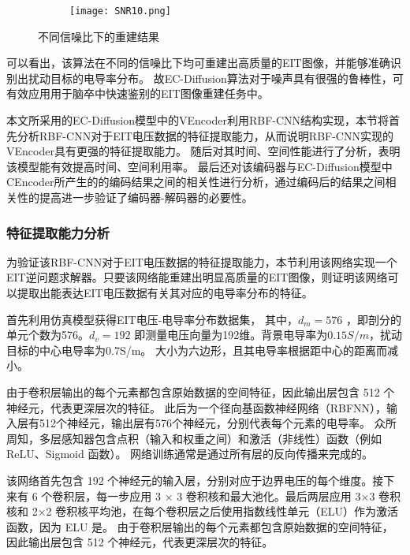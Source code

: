 \newcommand{\subfiggggg}{
\begin{subfigure}[b]{0.8\linewidth}
\centering
\texttt{[image: SNR10.png]}
\subcaption{信噪比为10时的重建结果}
\end{subfigure}
\label{subfigure:SNR30}
}

\begin{figure}[H]
    \subfigg
    \subfiggg
    \subfigggg
    \subfiggggg
    \caption{不同信噪比下的重建结果}
    \label{fig:SNR}
\end{figure}

可以看出，该算法在不同的信噪比下均可重建出高质量的EIT图像，并能够准确识别出扰动目标的电导率分布。
故EC-Diffusion算法对于噪声具有很强的鲁棒性，可有效应用用于脑卒中快速鉴别的EIT图像重建任务中。


本文所采用的EC-Diffusion模型中的VEncoder利用RBF-CNN结构实现，本节将首先分析RBF-CNN对于EIT电压数据的特征提取能力，从而说明RBF-CNN实现的VEncoder具有更强的特征提取能力。
随后对其时间、空间性能进行了分析，表明该模型能有效提高时间、空间利用率。
最后还对该编码器与EC-Diffusion模型中CEncoder所产生的的编码结果之间的相关性进行分析，通过编码后的结果之间相关性的提高进一步验证了编码器-解码器的必要性。

\subsubsection{特征提取能力分析}

为验证该RBF-CNN对于EIT电压数据的特征提取能力，本节利用该网络实现一个EIT逆问题求解器。只要该网络能重建出明显高质量的EIT图像，则证明该网络可以提取出能表达EIT电压数据有关其对应的电导率分布的特征。

首先利用仿真模型获得EIT电压-电导率分布数据集，
其中，$d_m =  576$ ，即剖分的单元个数为576。$d_v = 192$ 即测量电压向量为192维。背景电导率为$0.15S/m$，扰动目标的中心电导率为0.7S/m。
大小为六边形，且其电导率根据距中心的距离而减小。


由于卷积层输出的每个元素都包含原始数据的空间特征，因此输出层包含 512 个神经元，代表更深层次的特征。
此后为一个径向基函数神经网络（RBFNN），输入层有512个神经元，输出层有576个神经元，分别代表每个元素的电导率。
众所周知，多层感知器包含点积（输入和权重之间）和激活（非线性）函数（例如 ReLU、Sigmoid 函数）。
网络训练通常是通过所有层的反向传播来完成的。

该网络首先包含 192 个神经元的输入层，分别对应于边界电压的每个维度。接下来有 6 个卷积层，每一步应用 3 × 3 卷积核和最大池化。最后两层应用 3×3 卷积核和 2×2 卷积核平均池，在每个卷积层之后使用指数线性单元（ELU）作为激活函数，因为 ELU 是。
由于卷积层输出的每个元素都包含原始数据的空间特征，因此输出层包含 512 个神经元，代表更深层次的特征。

